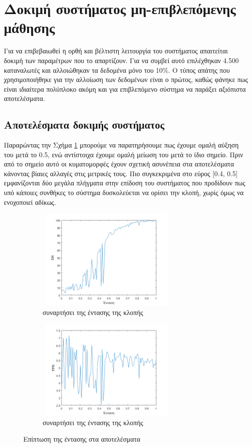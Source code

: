 \section{Δοκιμή συστήματος μη-επιβλεπόμενης μάθησης}
Για να επιβεβαιωθεί η ορθή και βέλτιστη λειτουργία του συστήματος απαιτείται δοκιμή των παραμέτρων που το απαρτίζουν. Για να συμβεί αυτό επιλέχθηκαν 4.500 καταναλωτές και αλλοιώθηκαν τα δεδομένα μόνο του 10\%. Ο τύπος απάτης που χρησιμοποιήθηκε για την αλλοίωση των δεδομένων είναι ο πρώτος, καθώς φάνηκε πως είναι ιδιαίτερα πολύπλοκο ακόμη και για επιβλεπόμενο σύστημα να παράξει αξιόπιστα αποτελέσματα.
\newpage
\subsection{Αποτελέσματα δοκιμής συστήματος}
Παραρώντας την Σχήμα \ref{fig:unsupDRintensity} μπορούμε να παρατηρήσουμε πως έχουμε ομαλή αύξηση του  μετά το 0.5, ενώ αντίστοιχα έχουμε ομαλή μείωση του  μετά το ίδιο σημείο. Πριν από το σημείο αυτό οι κυματομορφές έχουν σχετική ασυνέπεια στα αποτελέσματα κάνοντας βίαιες αλλαγές στις μετρικές τους. Πιο συγκεκριμένα στο εύρος [0.4, 0.5] εμφανίζονται δύο μεγάλα πλήγματα στην επίδοση του συστήματος που προδίδουν πως υπό κάποιες συνθήκες το σύστημα δυσκολεύεται να ορίσει την κλοπή, χωρίς όμως να ενοχοποιεί αδίκως.\par

\begin{figure}[ht!]
\centering
\begin{subfigure}[b]{0.4\textwidth}
 \includegraphics[width=70mm, height=50mm]{../../plots/gr_bigres_dr_intensity_un_sup.png}
\caption{ συναρτήσει της έντασης της κλοπής}
\label{fig:unsupDRintensity}
\end{subfigure}
\quad
\begin{subfigure}[b]{0.4\textwidth}
\includegraphics[width=70mm, height=50mm]{../../plots/gr_bigres_fpr_intensity_un_sup.png}
\caption{ συναρτήσει της έντασης της κλοπής}
\label{fig:linearFPRintensity}
\end{subfigure}
\caption{Επίπτωση της έντασης στα αποτελέσματα}
\label{fig:unsupintensityres}
\end{figure}

